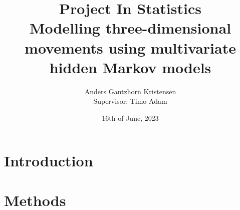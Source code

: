 \documentclass[11pt]{article}
\begin{document}
\pagestyle{fancy}
\fancyfoot{}
\fancyfoot[C]{\thepage}
\renewcommand{\headrulewidth}{0pt}
\renewcommand{\footrulewidth}{0pt}
\allowdisplaybreaks



\title{\vspace{-4cm}Project In Statistics\\
Modelling three-dimensional movements using
multivariate hidden Markov models}
\author{Anders Gantzhorn Kristensen\\
Supervisor: Timo Adam}
\date{16th of June, 2023}
\maketitle
\section*{Introduction}

\section*{Methods}





\end{document}
